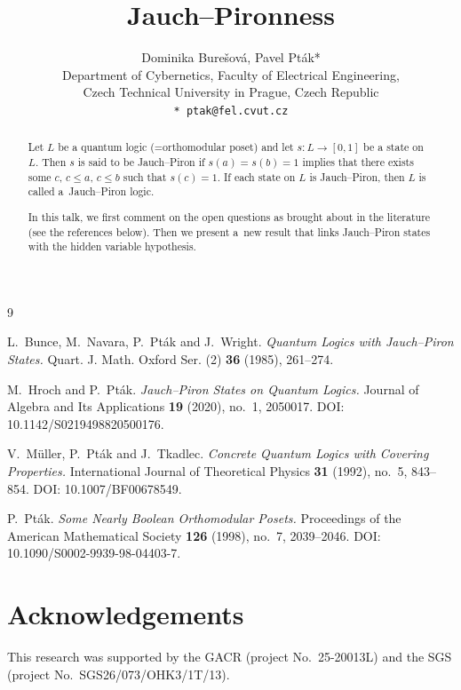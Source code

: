 \documentclass[a4paper]{article}
\date{}
\begin{document}
\setcounter{page}{1} %

\title{Jauch--Pironness}

\author{
Dominika Bure\v{s}ov\'{a}, Pavel Pt\'{a}k*\\
Department of Cybernetics, Faculty of Electrical Engineering,\\
Czech Technical University in Prague, Czech Republic\\[1ex]
\texttt{* ptak@fel.cvut.cz}
}

\maketitle
\begin{abstract}
Let $L$ be a quantum logic (=orthomodular poset)
and let $s:L\to[0,1]$ be a state on $L$.
Then $s$ is said to be Jauch--Piron if
$s(a)=s(b)=1$ implies that there exists some $c$, $c \leq a$, $c \leq b$ such that $s(c)=1$.
If each state on $L$ is Jauch--Piron, then $L$ is called a~Jauch--Piron logic.

In this talk, we first comment on the open questions as brought about in the literature (see the references below). Then we present a~new result that links Jauch--Piron states with the hidden variable hypothesis.

\end{abstract}


\begin{thebibliography}{9}

L.~Bunce, M.~Navara, P.~Pt\'ak and J.~Wright.
\newblock \emph{Quantum Logics with Jauch--Piron States.}
\newblock Quart. J. Math. Oxford Ser. (2) \textbf{36} (1985), 261--274.


 M.~Hroch and P.~Pt\'ak. \newblock \emph{Jauch--Piron States on Quantum Logics.} \newblock Journal of Algebra and Its Applications \textbf{19} (2020), no.~1, 2050017. \newblock DOI: 10.1142/S0219498820500176.

V.~M{\"u}ller, P.~Pt\'ak and J.~Tkadlec.
\newblock \emph{Concrete Quantum Logics with Covering Properties.}
\newblock International Journal of Theoretical Physics
\textbf{31} (1992), no.~5, 843--854.
\newblock DOI: 10.1007/BF00678549.

P.~Pt\'ak.
\newblock \emph{Some Nearly Boolean Orthomodular Posets.}
\newblock Proceedings of the American Mathematical Society
\textbf{126} (1998), no.~7, 2039--2046.
\newblock DOI: 10.1090/S0002-9939-98-04403-7.
\end{thebibliography}

\section*{Acknowledgements} This research was supported by the GACR (project No.~25-20013L) and the SGS (project No.~SGS26/073/OHK3/1T/13).
\end{document}
